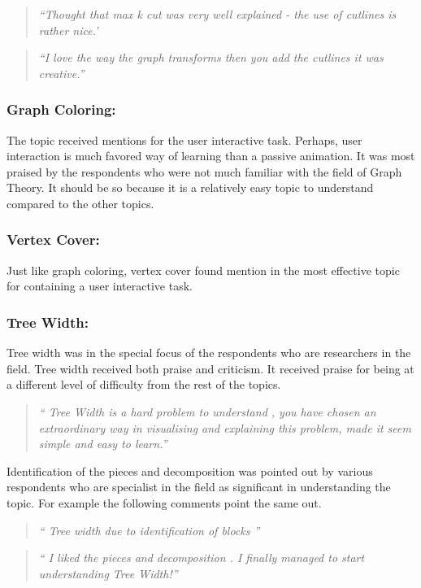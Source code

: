 \begin{quote}
\emph{``Thought that max k cut was very well explained - the use of cutlines is
rather nice.'}
\end{quote}

\begin{quote}
\emph{``I love the way the graph transforms then you add the cutlines it was
creative.''}
\end{quote}

\subsubsection{Graph Coloring:}
The topic received mentions for the user interactive task. Perhaps, user
interaction is much favored way of learning than a passive animation.
It was most praised by the respondents who were not much familiar with
the field of Graph Theory. It should be so because it is a relatively easy
topic to understand compared to the other topics.

\subsubsection{Vertex Cover:}
Just like graph coloring, vertex cover found mention in the most effective topic for 
containing a user interactive task.

\subsubsection{Tree Width:}
Tree width was in the special focus of the respondents who are researchers in
the field.  Tree width received both praise and criticism. It received praise
for being at a different level of difficulty from the rest of the topics.
\begin{quote}
\emph{``
Tree Width is a hard problem to understand , you
have chosen an extraordinary way in visualising and explaining this
problem, made it seem simple and easy to learn.''}
\end{quote}

Identification of the pieces and decomposition was pointed out by various
respondents who are specialist in the field as significant in understanding the
topic. For example the following comments point the same out.

\begin{quote}
\emph{``
Tree width due to identification of blocks
''}
\end{quote}
\begin{quote}
\emph{``
I liked the pieces and decomposition .
I finally managed to start understanding Tree Width!''}
\end{quote}

